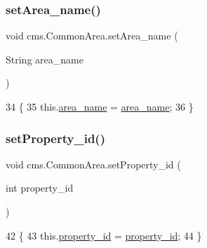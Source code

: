 \subsubsection{\texorpdfstring{set\+Area\+\_\+name()}{setArea\_name()}}
{\footnotesize\ttfamily void cms.\+Common\+Area.\+set\+Area\+\_\+name (\begin{DoxyParamCaption}\item[{String}]{area\+\_\+name }\end{DoxyParamCaption})\hspace{0.3cm}{\ttfamily [inline]}}


\begin{DoxyCode}
34                                                \{
35         this.\mbox{\hyperlink{classcms_1_1_common_area_a5f5060702efd265baeb61a83a9135088}{area\_name}} = \mbox{\hyperlink{classcms_1_1_common_area_a5f5060702efd265baeb61a83a9135088}{area\_name}};
36     \}
\end{DoxyCode}
\mbox{\label{classcms_1_1_common_area_a49ca83f36809d67c0556917c95e77608}} 
\subsubsection{\texorpdfstring{set\+Property\+\_\+id()}{setProperty\_id()}}
{\footnotesize\ttfamily void cms.\+Common\+Area.\+set\+Property\+\_\+id (\begin{DoxyParamCaption}\item[{int}]{property\+\_\+id }\end{DoxyParamCaption})\hspace{0.3cm}{\ttfamily [inline]}}


\begin{DoxyCode}
42                                                 \{
43         this.\mbox{\hyperlink{classcms_1_1_common_area_ad40e54e3b27cd75b9010bb8bc3d3acca}{property\_id}} = \mbox{\hyperlink{classcms_1_1_common_area_ad40e54e3b27cd75b9010bb8bc3d3acca}{property\_id}};
44     \}
\end{DoxyCode}
\mbox{\label{classcms_1_1_common_area_ad7c0ab35343d4d090bb9bfbd09acb066}} 
